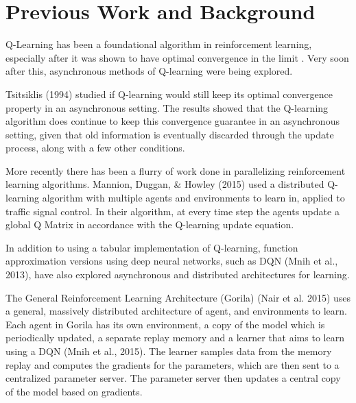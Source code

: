 \documentclass[jair,twoside,11pt,theapa]{article}
\begin{document}


\section{Previous Work and Background}
\label{Literature Survey}
Q-Learning \cite{watkins} has been a foundational algorithm in reinforcement learning, especially after it was shown to have optimal convergence in the limit \cite{qlearning}. Very soon after this, asynchronous methods of Q-learning were being explored.  

Tsitsiklis (1994) \nocite{Tsitsiklis1994} studied if Q-learning would still keep its optimal convergence property in an asynchronous setting. The results showed that the Q-learning algorithm does continue to keep this convergence guarantee in an asynchronous setting, given that old information is eventually discarded through the update process, along with a few other conditions. 

More recently there has been a flurry of work done in parallelizing reinforcement learning algorithms. Mannion, Duggan, \& Howley (2015) \nocite{MANNION2015956} used a distributed Q-learning algorithm with multiple agents and environments to learn in, applied to traffic signal control. In their algorithm, at every time step the agents update a global Q Matrix in accordance with the Q-learning update equation. 

In addition to using a tabular implementation of Q-learning, function approximation versions using deep neural networks, such as DQN (Mnih et al., 2013), have also explored asynchronous and distributed architectures for learning. 

The General Reinforcement Learning Architecture (Gorila) (Nair et al. 2015)\nocite{Gorila} uses a general, massively distributed architecture of agent, and environments to learn. Each agent in Gorila has its own environment, a copy of the model which is periodically updated, a separate replay memory and a learner that aims to learn using a DQN (Mnih et al., 2015)\nocite{Mnih2015}. The learner samples data from the memory replay and computes the gradients for the parameters, which are then sent to a centralized parameter server. The parameter server then updates a central copy of the model based on gradients. 
\end{document}

